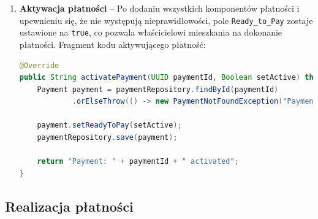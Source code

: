 \begin{enumerate}
\begin{lstlisting}[language=Java, caption=Fragment metody \texttt{addPaymentComponent}]
@Override
@Transactional
public PaymentResponse addPaymentComponent(UUID paymentId, PaymentComponentRequest paymentComponentRequest) throws PaymentNotFoundException {
    Payment payment = paymentRepository.findById(paymentId)
            .orElseThrow(() -> new PaymentNotFoundException("Payment: " + paymentId + " not found"));

    PaymentComponent paymentComponent = PaymentComponent.builder()
            .payment(payment)
            .componentType(paymentComponentRequest.getComponentType())
            .componentAmount(paymentComponentRequest.getComponentAmount())
            .unitPrice(paymentComponentRequest.getUnitPrice())
            .specialMultiplier(paymentComponentRequest.getSpecialMultiplier())
            .unit(paymentComponentRequest.getUnit())
            .build();

    payment.getPaymentComponents().add(paymentComponent);
    recalculatePaymentAmount(payment);
    paymentRepository.save(payment);

    return getPaymentResponse(payment, paymentComponent);
}
\end{lstlisting}

    \item \textbf{Aktywacja płatności} -- Po dodaniu wszystkich komponentów płatności i upewnieniu się, że nie występują nieprawidłowości, pole \texttt{Ready\_to\_Pay} zostaje ustawione na \texttt{true}, co pozwala właścicielowi mieszkania na dokonanie płatności. Fragment kodu aktywującego płatność:

\begin{lstlisting}[language=Java, caption=Fragment metody \texttt{activatePayment}]
@Override
public String activatePayment(UUID paymentId, Boolean setActive) throws PaymentNotFoundException {
    Payment payment = paymentRepository.findById(paymentId)
            .orElseThrow(() -> new PaymentNotFoundException("Payment: " + paymentId + " not found"));

    payment.setReadyToPay(setActive);
    paymentRepository.save(payment);

    return "Payment: " + paymentId + " activated";
}
\end{lstlisting}
\end{enumerate}

\subsection{Realizacja płatności}

